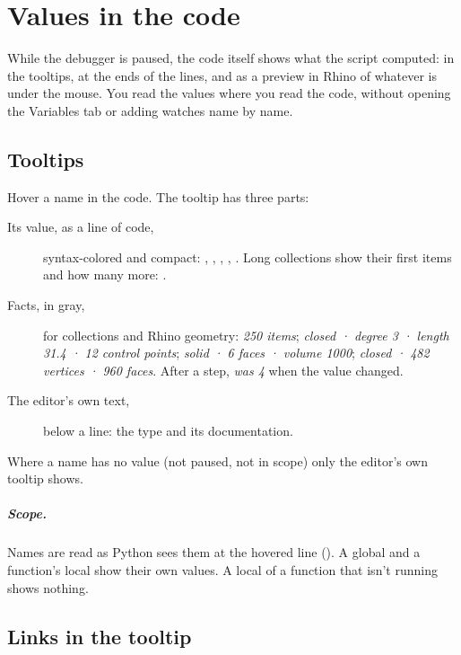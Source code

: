 \chapter{Values in the code}\label{ch:code}

While the debugger is paused, the code itself shows what the script computed: in the tooltips, at the
ends of the lines, and as a preview in Rhino of whatever is under the mouse. You read the values where
you read the code, without opening the Variables tab or adding watches name by name.

\section{Tooltips}\label{sec:tooltips}

Hover a name in the code. The tooltip has three parts:

\begin{description}
  \item[Its value, as a line of code,] syntax-colored and compact: ,
        , , ,
        . Long collections show their first items and how many more:
        .
  \item[Facts, in gray,] for collections and Rhino geometry: \emph{250 items};
        \emph{closed · degree 3 · length 31.4 · 12 control points}; \emph{solid · 6 faces · volume 1000};
        \emph{closed · 482 vertices · 960 faces}. After a step, \emph{was 4} when the value changed.
  \item[The editor's own text,] below a line: the type and its documentation.
\end{description}

Where a name has no value (not paused, not in scope) only the editor's own tooltip shows.

\paragraph{Scope.} Names are read as Python sees them at the hovered line (). A global
 and a function's local  show their own values. A local of a function that isn't
running shows nothing.

\section{Links in the tooltip}\label{sec:tooltiplinks}

